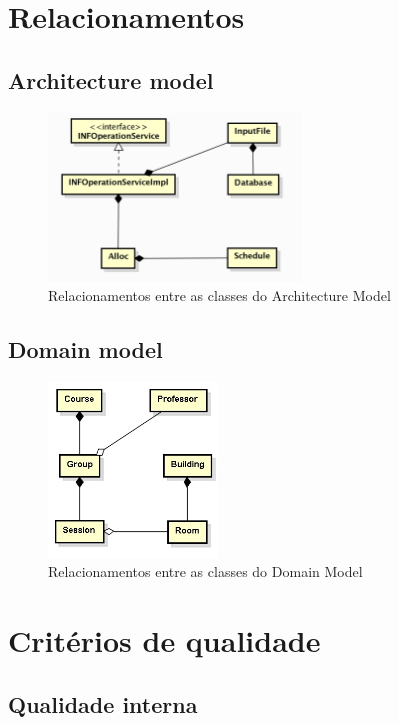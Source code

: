 \documentclass[a4paper]{article}
\begin{document}
\section{Relacionamentos}
\subsection{Architecture model}
\begin{figure}[H]
\centering
\includegraphics[width=0.6\textwidth]{ArchictectureModel.png}
\caption{\label{fig:ArchitectureModel}Relacionamentos entre as classes do Architecture Model}
\end{figure}

\subsection{Domain model}
\begin{figure}[H]
\centering
\includegraphics[width=0.4\textwidth]{domainModel.jpg}
\caption{\label{fig:domainModel}Relacionamentos entre as classes do Domain Model}
\end{figure}

\section{Critérios de qualidade}

\subsection{Qualidade interna}
\end{document}
